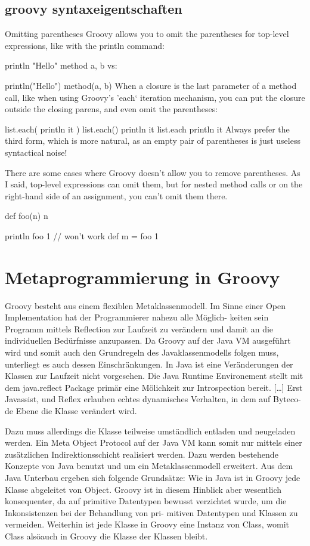 \documentclass[11pt,english,ngerman, headsepline]{scrreprt}
\begin{document}
\subsection{groovy syntaxeigentschaften}
Omitting parentheses
Groovy allows you to omit the parentheses for top-level expressions, like with the println command:

println "Hello"
method a, b
vs:

println("Hello")
method(a, b)
When a closure is the last parameter of a method call, like when using Groovy's 'each‘ iteration mechanism, you can put the closure outside the closing parens, and even omit the parentheses:

list.each( { println it } )
list.each(){ println it }
list.each  { println it }
Always prefer the third form, which is more natural, as an empty pair of parentheses is just useless syntactical noise!

There are some cases where Groovy doesn't allow you to remove parentheses. As I said, top-level expressions can omit them, but for nested method calls or on the right-hand side of an assignment, you can't omit them there.

def foo(n) { n }

println foo 1 // won't work
def m = foo 1

\section{Metaprogrammierung in Groovy}



Groovy besteht aus einem flexiblen Metaklassenmodell. Im Sinne einer Open
Implementation hat der Programmierer nahezu alle Möglich- keiten sein Programm
mittels Reflection zur Laufzeit zu verändern und damit an die individuellen
Bedürfnisse anzupassen. \cite{mpInGroovy} Da Groovy auf der Java VM ausgeführt
wird und somit auch den Grundregeln des Javaklassenmodells folgen muss,
unterliegt es auch dessen Einschränkungen. In Java ist eine Veränderungen der
Klassen zur Laufzeit nicht vorgesehen. Die Java Runtime Environement stellt mit
dem java.reflect Package primär eine Mölichkeit zur Introspection bereit.
[\ldots] 
Erst Javassist, und Reflex erlauben echtes dynamisches
Verhalten, in dem auf Byteco- de Ebene die Klasse verändert wird. 

Dazu muss allerdings die Klasse teilweise umständlich entladen und neugeladen
werden. 
Ein Meta Object Protocol auf der Java VM kann
somit nur mittels einer zusätzlichen Indirektionsschicht realisiert werden.
Dazu werden bestehende Konzepte von Java benutzt und um ein Metaklassenmodell
erweitert. Aus dem Java Unterbau ergeben sich folgende Grundsätze:
Wie in Java ist in Groovy jede Klasse abgeleitet von Object. Groovy ist in
diesem Hinblick aber wesentlich konsequenter, da auf primitive Datentypen
bewusst verzichtet wurde, um die Inkonsistenzen bei der Behandlung von pri-
mitiven Datentypen und Klassen zu vermeiden. Weiterhin ist jede Klasse in Groovy
eine Instanz von Class, womit Class alsöauch in Groovy die Klasse der Klassen
bleibt.  \cite{mpInGroovy}
\end{document}
